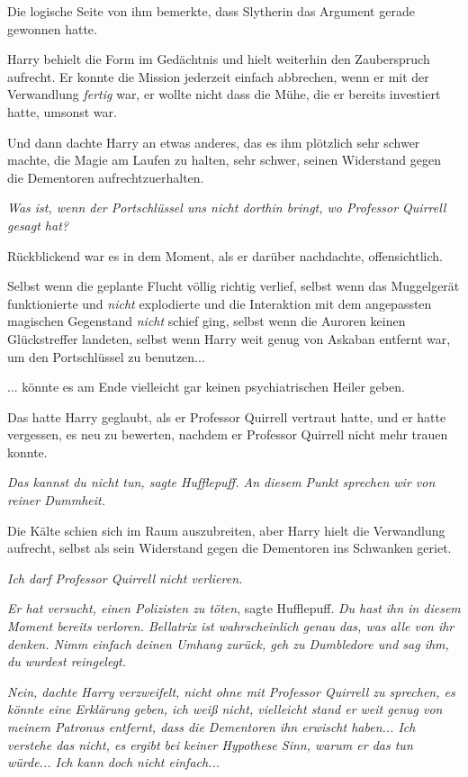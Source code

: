 {Die logische Seite von ihm bemerkte, dass Slytherin das Argument gerade gewonnen hatte.

Harry behielt die Form im Gedächtnis und hielt weiterhin den Zauberspruch aufrecht. Er konnte die Mission jederzeit einfach abbrechen, wenn er mit der Verwandlung \emph{fertig} war, er wollte nicht dass die Mühe, die er bereits investiert hatte, umsonst war.

Und dann dachte Harry an etwas anderes, das es ihm plötzlich sehr schwer machte, die Magie am Laufen zu halten, sehr schwer, seinen Widerstand gegen die Dementoren aufrechtzuerhalten.

\emph{\emph{Was ist, wenn der Portschlüssel uns nicht dorthin bringt, wo Professor Quirrell gesagt hat?}}

Rückblickend war es in dem Moment, als er darüber nachdachte, offensichtlich.

Selbst wenn die geplante Flucht völlig richtig verlief, selbst wenn das Muggelgerät funktionierte und \emph{nicht} explodierte und die Interaktion mit dem angepassten magischen Gegenstand \emph{nicht} schief ging, selbst wenn die Auroren keinen Glückstreffer landeten, selbst wenn Harry weit genug von Askaban entfernt war, um den Portschlüssel zu benutzen...

... könnte es am Ende vielleicht gar keinen psychiatrischen Heiler geben.

Das hatte Harry geglaubt, als er Professor Quirrell vertraut hatte, und er hatte vergessen, es neu zu bewerten, nachdem er Professor Quirrell nicht mehr trauen konnte.

\emph{\emph{Das} \emph{kannst du} \emph{nicht tun,} sagte Hufflepuff\emph{. An diesem Punkt sprechen wir von reiner Dummheit.}}

Die Kälte schien sich im Raum auszubreiten, aber Harry hielt die Verwandlung aufrecht, selbst als sein Widerstand gegen die Dementoren ins Schwanken geriet.

\emph{\emph{Ich darf Professor Quirrell nicht verlieren.}}

\emph{Er hat versucht, einen Polizisten zu töten}, sagte Hufflepuff. \emph{Du hast ihn in diesem Moment bereits verloren. Bellatrix ist wahrscheinlich genau das, was alle von ihr denken. Nimm einfach deinen Umhang zurück, geh zu Dumbledore und sag ihm, du wurdest reingelegt.}

\emph{\emph{Nein}, dachte Harry verzweifelt, \emph{nicht ohne mit Professor Quirrell zu sprechen, es könnte eine Erklärung geben, ich weiß nicht, vielleicht stand er weit genug von meinem Patronus entfernt, dass die Dementoren ihn erwischt haben... Ich verstehe das nicht, es ergibt bei} \emph{keiner} \emph{Hypothese} \emph{Sinn, warum er das tun würde... Ich kann doch nicht einfach...}}

}
